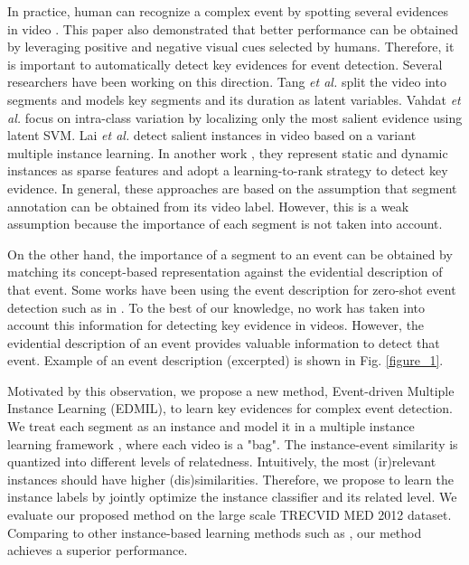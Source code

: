In practice, human can recognize a complex event by spotting several evidences in video \cite{bhattacharya2014minimally}. This paper also demonstrated that better performance can be obtained by leveraging positive and negative visual cues selected by humans. Therefore, it is important to automatically detect key evidences for event detection. Several researchers have been working on this direction. Tang \textit{et al.} \cite{tang2012learning} split the video into segments and models key segments and its duration as latent variables. Vahdat \textit{et al.} \cite{vahdat2013compositional} focus on intra-class variation by localizing only the most salient evidence using latent SVM. 
Lai \textit{et al.} \cite{lai2014video} detect salient instances in video based on a variant multiple instance learning. In another work \cite{lai2014recognizing}, they represent static and dynamic instances as sparse features and adopt a learning-to-rank strategy to detect key evidence. In general, these approaches are based on the assumption that segment annotation can be obtained from its video label. However, this is a weak assumption because the importance of each segment is not taken into account. 

On the other hand, the importance of a segment to an event can be obtained by matching its concept-based representation against the evidential description of that event. Some works have been using the event description for zero-shot event detection such as in \cite{chen2014event,wu2014zero}. To the best of our knowledge, no work has taken into account this information for detecting key evidence in videos. However, the evidential description of an event provides valuable information to detect that event. Example of an event description (excerpted) is shown in Fig. \ref{figure_1}. 

Motivated by this observation, we propose a new method, Event-driven Multiple Instance Learning (EDMIL), to learn key evidences for complex event detection. We treat each segment as an instance and model it in a multiple instance learning framework \cite{andrews2002support}, where each video is a "bag". The instance-event similarity is quantized into different levels of relatedness. Intuitively, the most (ir)relevant instances should have higher (dis)similarities. Therefore, we propose to learn the instance labels by jointly optimize the instance classifier and its related level. We evaluate our proposed method on the large scale TRECVID MED 2012 dataset. Comparing to other instance-based learning methods such as \cite{andrews2002support,lai2014video}, our method achieves a superior performance.

